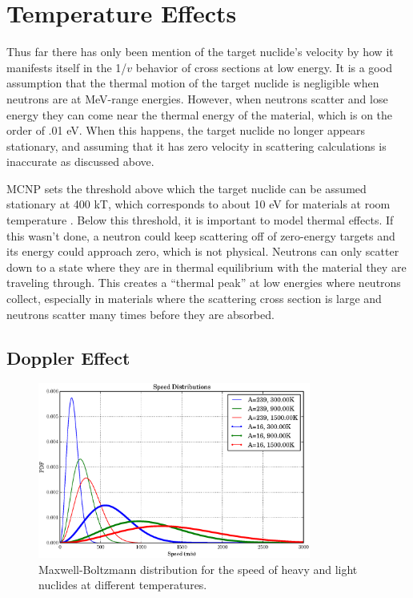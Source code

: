 \section{Temperature Effects}
\label{sec:temp}

Thus far there has only been mention of the target nuclide's velocity by how it manifests itself in the 1/$v$ behavior of cross sections at low energy.  It is a good assumption that the thermal motion of the target nuclide is negligible when neutrons are at MeV-range energies.  However, when neutrons scatter and lose energy they can come near the thermal energy of the material, which is on the order of .01 eV.  When this happens, the target nuclide no longer appears stationary, and assuming that it has zero velocity in scattering calculations is inaccurate as discussed above. 

MCNP sets the threshold above which the target nuclide can be assumed stationary at 400 kT, which corresponds to about 10 eV for materials at room temperature \cite{mcnp}.  Below this threshold, it is important to model thermal effects.  If this wasn't done, a neutron could keep scattering off of zero-energy targets and its energy could approach zero, which is not physical.  Neutrons can only scatter down to a state where they are in thermal equilibrium with the material they are traveling through.  This creates a ``thermal peak'' at low energies where neutrons collect, especially in materials where the scattering cross section is large and neutrons scatter many times before they are absorbed.

\subsection{Doppler Effect}

\begin{figure}[h!]
  \centering
    \includegraphics[width=0.8\textwidth]{graphics/MB_dist.eps}
     \caption{Maxwell-Boltzmann distribution for the speed of heavy and light nuclides at different temperatures.   \label{MB_dist}}
\end{figure}

